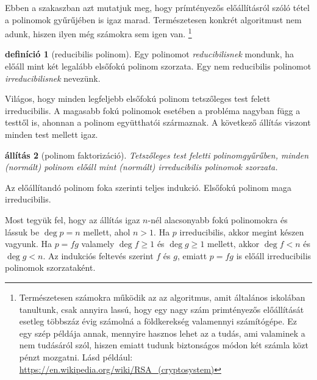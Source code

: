 \documentclass[a4paper, showtrims]{memoir}
\makeatletter
\renewenvironment{proof}[1][\proofname]
    {\par\pushQED{\qed}%
    \normalfont \topsep6\p@\@plus6\p@\relax
    \trivlist
    \item[\hskip\labelsep
        \itshape
    #1\@addpunct{:}]\ignorespaces}
    {\popQED\endtrivlist\@endpefalse}
\theoremstyle{plain}
\newtheorem{proposition}{állítás}[chapter]
\theoremstyle{remark}
\theoremstyle{definition}
\newtheorem{definition}[proposition]{definíció}
\makeatother
\begin{document}
Ebben a szakaszban azt mutatjuk meg, hogy prímtényezős előállításról szóló tétel a polinomok gyűrűjében is igaz marad.
Természetesen konkrét algoritmust nem adunk, hiszen ilyen még számokra sem igen van.%
\footnote{Természetesen számokra működik az az algoritmus, amit általános iskolában tanultunk,
	csak annyira lassú, hogy egy nagy szám primtényezős előállítását esetleg többszáz évig számolná a földkerekség valamennyi számítógépe.
	Ez egy szép példája annak,
	mennyire hasznos lehet az a tudás,
	ami valaminek a nem tudásáról szól,
	hiszen
	emiatt tudunk biztonságos módon két számla közt pénzt mozgatni.
	Lásd például: \url{https://en.wikipedia.org/wiki/RSA_(cryptosystem)}}
\begin{definition}[reducibilis polinom]
	Egy polinomot \emph{reducibilisnek} mondunk,
	ha előáll mint két legalább elsőfokú polinom szorzata.
	Egy nem reducibilis polinomot \emph{irreducibilisnek} nevezünk.
\end{definition}
Világos, hogy minden legfeljebb elsőfokú polinom tetszőleges test felett irreducibilis.
A magasabb fokú polinomok esetében a probléma nagyban függ a testtől is,
ahonnan a polinom együtthatói származnak.
A következő állítás viszont minden test mellett igaz.
\begin{proposition}[polinom faktorizáció]\label{pr:polfact}
	Tetszőleges test feletti polinomgyűrűben,
	minden (normált) polinom előáll mint (normált) irreducibilis polinomok szorzata.
\end{proposition}
\begin{proof}
	Az előállítandó polinom foka szerinti teljes indukció.
	Elsőfokú polinom maga irreducibilis.

	Most tegyük fel, hogy az állítás igaz $n$-nél alacsonyabb fokú polinomokra
	és lássuk be $\deg p=n$ mellett, ahol $n>1$.
	Ha $p$ irreducibilis, akkor megint készen vagyunk.
	Ha $p=f g$ valamely $\deg f\geq 1$ és $\deg g\geq 1$ mellett,
	akkor $\deg f<n$ és $\deg g<n$.
	Az indukciós feltevés szerint $f$ és $g$, emiatt $p=fg$ is előáll irreducibilis polinomok szorzataként.
\end{proof}
\end{document}
